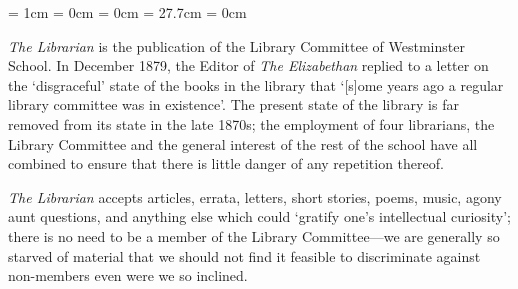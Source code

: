 \pagestyle{empty}

\topmargin = 1cm
\headheight = 0cm
\headsep = 0cm
\textheight = 27.7cm
\footskip = 0cm
\setlength{\voffset}{-1in}

\begin{multicols}{2}

\textit{The Librarian} is the publication of the Library Committee of Westminster School. In December 1879, the Editor of \textit{The Elizabethan} replied to a letter on the `disgraceful' state of the books in the library that `[s]ome years ago a regular library committee was in existence'. The present state of the library is far removed from its state in the late 1870s; the employment of four librarians, the Library Committee and the general interest of the rest of the school have all combined to ensure that there is little danger of any repetition thereof.

\textit{The Librarian} accepts articles, errata, letters, short stories, poems, music, agony aunt questions, and anything else which could `gratify one's intellectual curiosity'; there is no need to be a member of the Library Committee---we are generally so starved of material that we should not find it feasible to discriminate against non-members even were we so inclined.



\end{multicols}